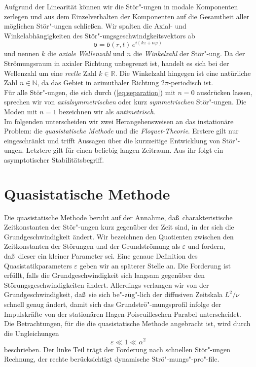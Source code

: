 \documentclass[10pt,a5paper,oneside,draft]{book}
\numberwithin{equation}{chapter}
\begin{document}
Aufgrund der Linearit\"at k\"onnen wir die St\"or"-ungen in modale Komponenten zerlegen und aus dem Einzelverhalten der Komponenten auf die Gesamtheit aller m\"oglichen St\"or"-ungen schlie\ss en.
Wir spalten die Axial- und Winkelabh\"angigkeiten des St\"or"-ungsgeschwindgkeitsvektors ab
\begin{equation}\label{eq:separation}
	\mathfrak{v} = \bar{\mathfrak{v}}(r,t)\, e^{i(kz + n\varphi)}
\end{equation}
und nennen $k$ die \textit{axiale Wellenzahl} und $n$ die \textit{Winkelzahl} der St\"or"-ung.
Da der Str\"omungsraum in axialer Richtung unbegrenzt ist, handelt es sich bei der Wellenzahl um eine \textit{reelle} Zahl $k\in\mathbb{R}$.
Die Winkelzahl hingegen ist eine nat\"urliche Zahl $n\in\mathbb{N}$, da das Gebiet in azimuthaler Richtung $2\pi$-periodisch ist.\\
F\"ur alle St\"or"-ungen, die sich durch (\mbox{\ref{eq:separation}}) mit $n=0$ ausdr\"ucken lassen, sprechen wir von \textit{axialsymmetrischen} oder kurz \textit{symmetrischen} St\"or"-ungen.
Die Moden mit $n=1$ bezeichnen wir als \textit{antimetrisch}.\\%

Im folgenden unterscheiden wir zwei Herangehensweisen an das instation\"are Problem: die \textit{quasistatische Methode} und die \textit{Floquet-\!Theorie}.
Erstere gilt nur eingeschr\"ankt und trifft Aussagen \"uber die kurzzeitige Entwicklung von St\"or"-ungen.
Letztere gilt f\"ur einen beliebig langen Zeitraum.
Aus ihr folgt ein asymptotischer Stabilit\"atsbegriff.

\chapter{Quasistatische Methode}\label{sec:quasistatik}
Die quasistatische Methode beruht auf der Annahme, da\ss\ charakteristische Zeitkonstanten der St\"or"-ungen kurz gegen\"uber der Zeit sind, in der sich die Grundgeschwindigkeit \"andert.
Wir bezeichnen den Quotienten zwischen den Zeitkonstanten der St\"orungen und der Grundstr\"omung als $\varepsilon$ und fordern, da\ss\ dieser ein kleiner Parameter sei.
Eine genaue Definition des Quasistatikparameters $\varepsilon$ geben wir an sp\"aterer Stelle an.
Die Forderung ist erf\"ullt, falls die Grundgeschwindigkeit sich langsam gegen\"uber den St\"orungsgeschwindigkeiten \"andert.
Allerdings verlangen wir von der Grundgeschwindigkeit, da\ss\ sie sich be"-z\"ug"-lich der diffusiven Zeitskala $L^2/\nu$ schnell genug \"andert, damit sich das Grundstr\"o"-mungsprofil infolge der Impulskr\"afte von der station\"aren Hagen-Poiseuilleschen Parabel unterscheidet.
Die Betrachtungen, f\"ur die die quasistatische Methode angebracht ist, wird durch die Ungleichungen
\begin{equation}\label{eq:quasisteady}
	\varepsilon \ll 1 \ll \alpha^2
\end{equation}
beschrieben.
Der linke Teil tr\"agt der Forderung nach schnellen St\"or"-ungen Rechnung, der rechte ber\"ucksichtigt dynamische Str\"o"-mungs"-pro"-file.\\
\end{document}
